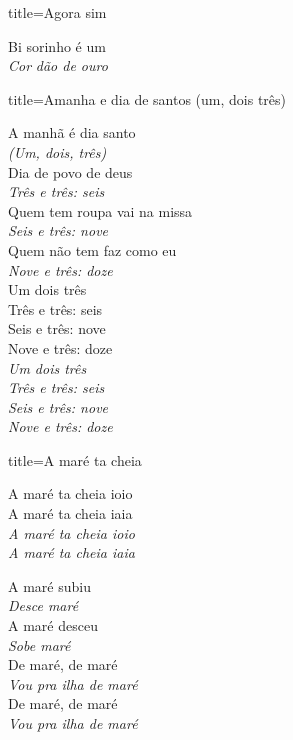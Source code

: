 \documentclass[fontsize=14pt, paper=a4, twoside, DIV=20]{scrreprt} %
\begin{document}
\begin{multicols*}{2}
\begin{song}{title={Agora sim}}
\begin{verse*}
Bi sorinho é um\\
\textit{Cor} \textit{dão de ouro}\\
\end{verse*}

\end{song}

\begin{song}{title={Amanha e dia de santos (um, dois três)}}

    \begin{verse*}
        A manhã é dia santo\\
         \textit{(Um, dois, três)}\\
        Dia de povo de deus\\
\textit{Três e três: seis}\\
Quem tem roupa vai na missa\\
\textit{Seis e três: nove}\\
Quem não tem faz como eu\\
\textit{Nove e três: doze}\\

Um dois três\\
Três e três: seis\\
Seis e três: nove\\
Nove e três: doze\\
\textit{Um dois três}\\
\textit{Três e três: seis}\\
\textit{Seis e três: nove}\\
\textit{Nove e três: doze}\\


\end{verse*}
\end{song}

\begin{song}{title={A maré ta cheia}}
        \begin{chorus*}
                A maré ta cheia ioio \\
                A maré ta cheia iaia \\
                \textit{A maré ta cheia ioio \\
                A maré ta cheia iaia \\}
        \end{chorus*}
        \begin{verse*}
                A maré subiu \\
                \textit{Desce maré} \\
                A maré desceu \\
                \textit{Sobe maré} \\
                De maré, de maré \\
                \textit{Vou pra ilha de maré} \\
                De maré, de maré \\
                \textit{Vou pra ilha de maré} \\


\end{verse*}
\end{song}
\end{multicols*}
\end{document}
